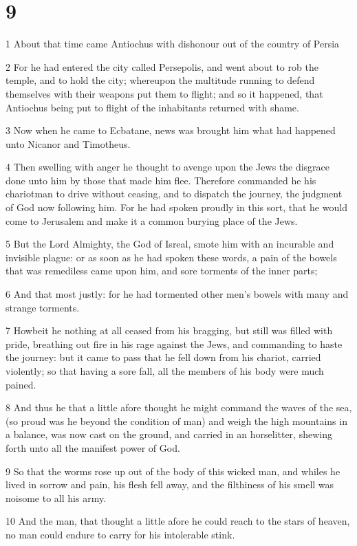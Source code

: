 \chapter{9}

\par 1 About that time came Antiochus with dishonour out of the country of Persia
\par 2 For he had entered the city called Persepolis, and went about to rob the temple, and to hold the city; whereupon the multitude running to defend themselves with their weapons put them to flight; and so it happened, that Antiochus being put to flight of the inhabitants returned with shame.
\par 3 Now when he came to Ecbatane, news was brought him what had happened unto Nicanor and Timotheus.
\par 4 Then swelling with anger he thought to avenge upon the Jews the disgrace done unto him by those that made him flee. Therefore commanded he his chariotman to drive without ceasing, and to dispatch the journey, the judgment of God now following him. For he had spoken proudly in this sort, that he would come to Jerusalem and make it a common burying place of the Jews.
\par 5 But the Lord Almighty, the God of Isreal, smote him with an incurable and invisible plague: or as soon as he had spoken these words, a pain of the bowels that was remediless came upon him, and sore torments of the inner parts;
\par 6 And that most justly: for he had tormented other men's bowels with many and strange torments.
\par 7 Howbeit he nothing at all ceased from his bragging, but still was filled with pride, breathing out fire in his rage against the Jews, and commanding to haste the journey: but it came to pass that he fell down from his chariot, carried violently; so that having a sore fall, all the members of his body were much pained.
\par 8 And thus he that a little afore thought he might command the waves of the sea, (so proud was he beyond the condition of man) and weigh the high mountains in a balance, was now cast on the ground, and carried in an horselitter, shewing forth unto all the manifest power of God.
\par 9 So that the worms rose up out of the body of this wicked man, and whiles he lived in sorrow and pain, his flesh fell away, and the filthiness of his smell was noisome to all his army.
\par 10 And the man, that thought a little afore he could reach to the stars of heaven, no man could endure to carry for his intolerable stink.

